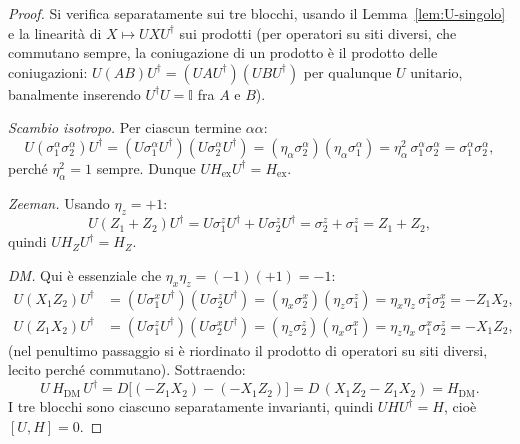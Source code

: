 \documentclass[11pt,a4paper]{article}
\begin{document}
\begin{proof}
Si verifica separatamente sui tre blocchi, usando il Lemma~\ref{lem:U-singolo} e la linearità
di $X\mapsto UXU^\dagger$ sui prodotti (per operatori su siti diversi, che commutano sempre, la
coniugazione di un prodotto è il prodotto delle coniugazioni: $U(AB)U^\dagger=(UAU^\dagger)(UBU^\dagger)$
per qualunque $U$ unitario, banalmente inserendo $U^\dagger U=\mathbb I$ fra $A$ e $B$).

\emph{Scambio isotropo.} Per ciascun termine $\alpha\alpha$:
\begin{equation}
U(\sigma_1^\alpha\sigma_2^\alpha)U^\dagger
= (U\sigma_1^\alpha U^\dagger)(U\sigma_2^\alpha U^\dagger)
= (\eta_\alpha\sigma_2^\alpha)(\eta_\alpha\sigma_1^\alpha)
= \eta_\alpha^2\,\sigma_1^\alpha\sigma_2^\alpha = \sigma_1^\alpha\sigma_2^\alpha,
\end{equation}
perché $\eta_\alpha^2=1$ sempre. Dunque $U H_{\mathrm{ex}} U^\dagger = H_{\mathrm{ex}}$.

\emph{Zeeman.} Usando $\eta_z=+1$:
\begin{equation}
U(Z_1+Z_2)U^\dagger = U\sigma_1^zU^\dagger + U\sigma_2^zU^\dagger
= \sigma_2^z+\sigma_1^z = Z_1+Z_2,
\end{equation}
quindi $UH_ZU^\dagger=H_Z$.

\emph{DM.} Qui è essenziale che $\eta_x\eta_z=(-1)(+1)=-1$:
\begin{align}
U(X_1Z_2)U^\dagger &= (U\sigma_1^xU^\dagger)(U\sigma_2^zU^\dagger)
= (\eta_x\sigma_2^x)(\eta_z\sigma_1^z) = \eta_x\eta_z\,\sigma_1^z\sigma_2^x = -Z_1X_2, \\
U(Z_1X_2)U^\dagger &= (U\sigma_1^zU^\dagger)(U\sigma_2^xU^\dagger)
= (\eta_z\sigma_2^z)(\eta_x\sigma_1^x) = \eta_z\eta_x\,\sigma_1^x\sigma_2^z = -X_1Z_2,
\end{align}
(nel penultimo passaggio si è riordinato il prodotto di operatori su siti diversi, lecito perché
commutano). Sottraendo:
\begin{equation}
U\,H_{\mathrm{DM}}\,U^\dagger = D\big[(-Z_1X_2)-(-X_1Z_2)\big] = D\,(X_1Z_2-Z_1X_2) = H_{\mathrm{DM}}.
\end{equation}
I tre blocchi sono ciascuno separatamente invarianti, quindi $UHU^\dagger=H$, cioè $[U,H]=0$.
\end{proof}
\end{document}

